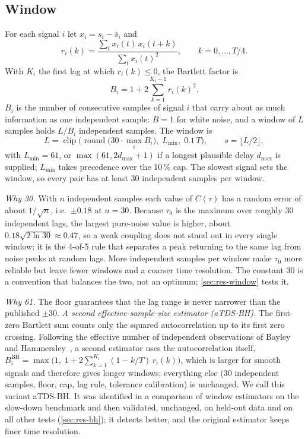 \documentclass[11pt,a4paper]{article}
\begin{document}
\subsection{Window}
\label{sec:window}
For each signal $i$ let $x_i = s_i - \bar s_i$ and
\begin{equation}
r_i(k) = \frac{\sum_t x_i(t)\, x_i(t+k)}{\sum_t x_i(t)^2}, \qquad k = 0, \dots, T/4 .
\end{equation}
With $K_i$ the first lag at which $r_i(k) \le 0$, the Bartlett factor is
\begin{equation}
B_i = 1 + 2 \sum_{k=1}^{K_i - 1} r_i(k)^2 .
\label{eq:bartlett}
\end{equation}
$B_i$ is the number of consecutive samples of signal $i$ that carry about as much information as one independent sample: $B = 1$ for white noise, and a window of $L$ samples holds $L / B_i$ independent samples. The window is
\begin{equation}
L = \operatorname{clip}\!\Big(\operatorname{round}\big(30 \cdot \max_i B_i\big),\; L_{\min},\; 0.1\,T\Big), \qquad s = \lfloor L/2 \rfloor ,
\label{eq:window}
\end{equation}
with $L_{\min} = 61$, or $\max(61, 2 d_{\max} + 1)$ if a longest plausible delay $d_{\max}$ is supplied; $L_{\min}$ takes precedence over the 10\,\% cap. The slowest signal sets the window, so every pair has at least 30 independent samples per window.

\emph{Why 30.} With $n$ independent samples each value of $C(\tau)$ has a random error of about $1/\sqrt{n}$, i.e.\ $\pm0.18$ at $n = 30$. Because $\tau_0$ is the maximum over roughly 30 independent lags, the largest pure-noise value is higher, about $0.18\sqrt{2\ln 30} \approx 0.47$, so a weak coupling does not stand out in every single window; it is the 4-of-5 rule that separates a peak returning to the same lag from noise peaks at random lags. More independent samples per window make $\tau_0$ more reliable but leave fewer windows and a coarser time resolution. The constant 30 is a convention that balances the two, not an optimum; \cref{sec:res-window} tests it.

\emph{Why 61.} The floor guarantees that the lag range is never narrower than the published $\pm30$.
\emph{A second effective-sample-size estimator (aTDS-BH).} The first-zero Bartlett sum counts only the squared autocorrelation up to its first zero crossing. Following the effective number of independent observations of Bayley and Hammersley~\cite{Bayley1946EffectiveNumber}, a second estimator uses the autocorrelation itself, $B^{\mathrm{BH}}_i = \max\!\big(1,\; 1 + 2\sum_{k=1}^{K_i} (1 - k/T)\, r_i(k)\big)$, which is larger for smooth signals and therefore gives longer windows; everything else (30 independent samples, floor, cap, lag rule, tolerance calibration) is unchanged. We call this variant aTDS-BH. It was identified in a comparison of window estimators on the slow-down benchmark and then validated, unchanged, on held-out data and on all other tests (\cref{sec:res-bh}); it detects better, and the original estimator keeps finer time resolution.
\end{document}
